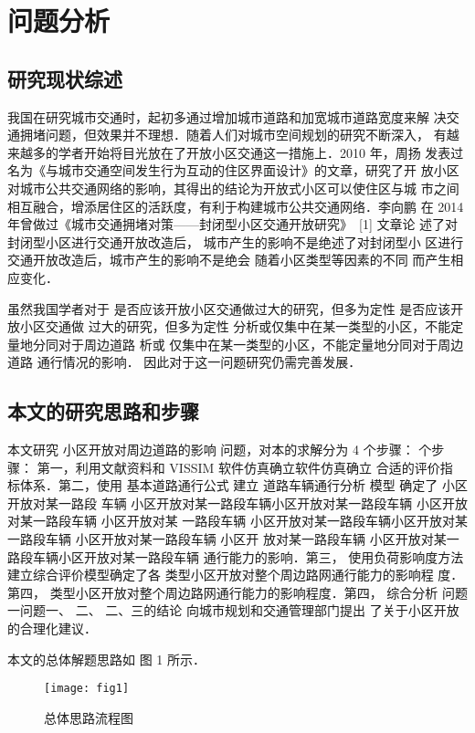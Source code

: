 \section{问题分析}

\subsection{研究现状综述}
我国在研究城市交通时，起初多通过增加城市道路和加宽城市道路宽度来解
决交通拥堵问题，但效果并不理想．随着人们对城市空间规划的研究不断深入，
有越来越多的学者开始将目光放在了开放小区交通这一措施上．2010 年，周扬
发表过名为《与城市交通空间发生行为互动的住区界面设计》的文章，研究了开
放小区对城市公共交通网络的影响，其得出的结论为开放式小区可以使住区与城
市之间相互融合，增添居住区的活跃度，有利于构建城市公共交通网络．李向鹏
在 2014 年曾做过《城市交通拥堵对策——封闭型小区交通开放研究》~[1] 文章论
述了对封闭型小区进行交通开放改造后， 城市产生的影响不是绝述了对封闭型小
区进行交通开放改造后，城市产生的影响不是绝会 随着小区类型等因素的不同 而产生相应变化．

虽然我国学者对于 是否应该开放小区交通做过大的研究，但多为定性 是否应该开放小区交通做
过大的研究，但多为定性 分析或仅集中在某一类型的小区，不能定量地分同对于周边道路 析或
仅集中在某一类型的小区，不能定量地分同对于周边道路 通行情况的影响．
因此对于这一问题研究仍需完善发展．

\subsection{本文的研究思路和步骤}
\setlength{\parindent}{2em}本文研究 小区开放对周边道路的影响 问题，对本的求解分为
4 个步骤： 个步骤： 第一，利用文献资料和 VISSIM 软件仿真确立软件仿真确立 合适的评价指
标体系．第二，使用 基本道路通行公式 建立 道路车辆通行分析 模型 确定了 小区开放对某一路段
车辆 小区开放对某一路段车辆小区开放对某一路段车辆 小区开放对某一路段车辆 小区开放对某
一路段车辆 小区开放对某一路段车辆小区开放对某一路段车辆 小区开放对某一路段车辆 小区开
放对某一路段车辆 小区开放对某一路段车辆小区开放对某一路段车辆 通行能力的影响．第三，
使用负荷影响度方法建立综合评价模型确定了各 类型小区开放对整个周边路网通行能力的影响程
度．第四， 类型小区开放对整个周边路网通行能力的影响程度．第四， 综合分析 问题一问题一、
 二、 二、三的结论 向城市规划和交通管理部门提出 了关于小区开放的合理化建议．

本文的总体解题思路如 图 1 所示．

\begin{figure}[h!]
\centerline{\texttt{[image: fig1]}}
  \caption{总体思路流程图}
  \label{fig1}
\end{figure}


